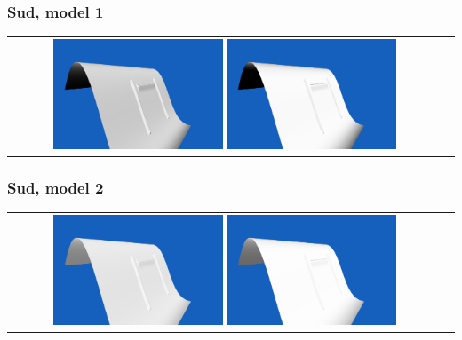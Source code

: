 \documentclass[a4paper]{article}
\begin{document}
\subsubsection{Sud, model 1}
\begin{tabular}{cc}
\includegraphics[width=0.4\textwidth]{Images/Essais/Essai_7_phong_South_0.png}
\includegraphics[width=0.4\textwidth]{Images/Essais/Essai_7_slint_South_0.png}
\end{tabular}
\subsubsection{Sud, model 2}
\begin{tabular}{cc}
\includegraphics[width=0.4\textwidth]{Images/Essais/Essai_7_phong_South_1.png}
\includegraphics[width=0.4\textwidth]{Images/Essais/Essai_7_slint_South_1.png}
\end{tabular}
\end{document}
